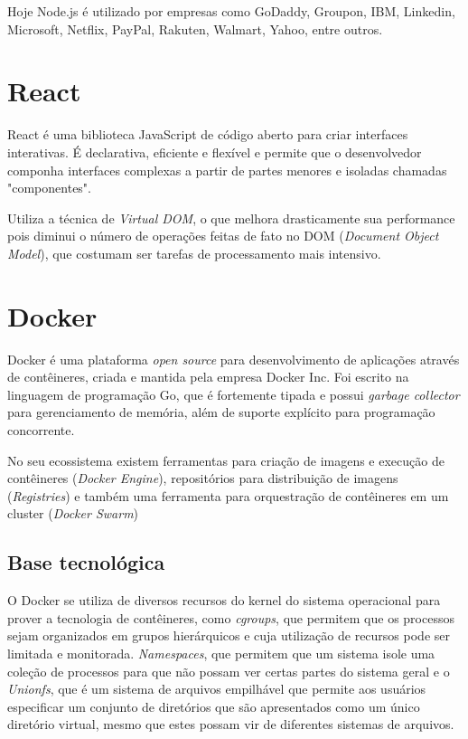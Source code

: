                 Hoje Node.js é utilizado por empresas como GoDaddy, Groupon, IBM, Linkedin, Microsoft, Netflix, PayPal, Rakuten, Walmart, Yahoo, entre outros.

    \section{React}
        React é uma biblioteca JavaScript de código aberto para criar interfaces interativas. É declarativa, eficiente e flexível e permite que o desenvolvedor componha interfaces complexas a partir de partes menores e isoladas chamadas "componentes".

        Utiliza a técnica de \textit{Virtual DOM}, o que melhora drasticamente sua performance pois diminui o número de operações feitas de fato no DOM (\textit{Document Object Model}), que costumam ser tarefas de processamento mais intensivo.

	
	\section{Docker}
	    Docker é uma plataforma \textit{open source} para desenvolvimento de aplicações através de contêineres, criada e mantida pela empresa Docker Inc. Foi escrito na linguagem de programação Go, que é fortemente tipada e possui \textit{garbage collector} para gerenciamento de memória, além de suporte explícito para programação concorrente.
	
	    No seu ecossistema existem ferramentas para criação de imagens e execução de con\-têi\-ne\-res (\textit{Docker Engine}), repositórios para distribuição de imagens (\textit{Registries}) e também uma ferramenta para orquestração de con\-têi\-ne\-res em um cluster (\textit{Docker Swarm})
	
	
    	\subsection{Base tecnológica}
    	    O Docker se utiliza de diversos recursos do kernel do sistema operacional para prover a tecnologia de contêineres, como \textit{cgroups}, que permitem que os processos sejam organizados em grupos hierárquicos e cuja utilização de recursos pode ser limitada e monitorada. \textit{Namespaces}, que permitem que um sistema isole uma coleção de processos para que não possam ver certas partes do sistema geral e o \textit{Unionfs}, que é um sistema de arquivos empilhável que permite aos usuários especificar um conjunto de diretórios que são apresentados como um único diretório virtual, mesmo que estes possam vir de diferentes sistemas de arquivos.
    	
